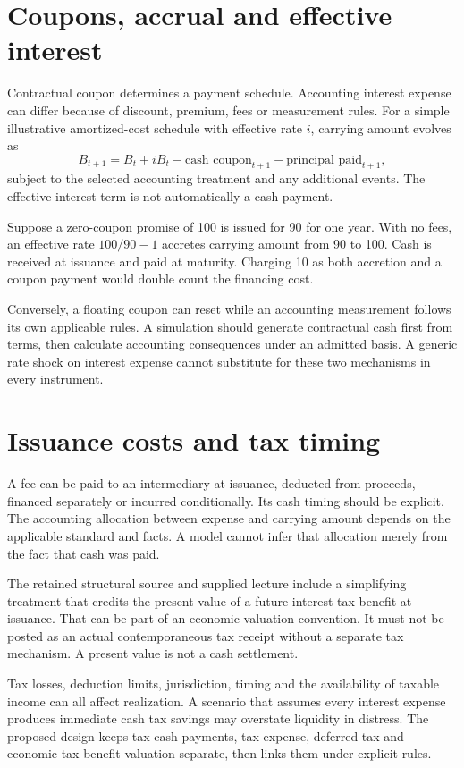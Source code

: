 \section{Coupons, accrual and effective interest}
Contractual coupon determines a payment schedule. Accounting interest expense can differ because of discount, premium, fees or measurement rules. For a simple illustrative amortized-cost schedule with effective rate $i$, carrying amount evolves as
\begin{equation}
 B_{t+1}=B_t+iB_t-\text{cash coupon}_{t+1}-\text{principal paid}_{t+1},
\end{equation}
subject to the selected accounting treatment and any additional events. The effective-interest term is not automatically a cash payment.

Suppose a zero-coupon promise of 100 is issued for 90 for one year. With no fees, an effective rate $100/90-1$ accretes carrying amount from 90 to 100. Cash is received at issuance and paid at maturity. Charging 10 as both accretion and a coupon payment would double count the financing cost.

Conversely, a floating coupon can reset while an accounting measurement follows its own applicable rules. A simulation should generate contractual cash first from terms, then calculate accounting consequences under an admitted basis. A generic rate shock on interest expense cannot substitute for these two mechanisms in every instrument.

\section{Issuance costs and tax timing}
A fee can be paid to an intermediary at issuance, deducted from proceeds, financed separately or incurred conditionally. Its cash timing should be explicit. The accounting allocation between expense and carrying amount depends on the applicable standard and facts. A model cannot infer that allocation merely from the fact that cash was paid.

The retained structural source and supplied lecture include a simplifying treatment that credits the present value of a future interest tax benefit at issuance. That can be part of an economic valuation convention. It must not be posted as an actual contemporaneous tax receipt without a separate tax mechanism. A present value is not a cash settlement.

Tax losses, deduction limits, jurisdiction, timing and the availability of taxable income can all affect realization. A scenario that assumes every interest expense produces immediate cash tax savings may overstate liquidity in distress. The proposed design keeps tax cash payments, tax expense, deferred tax and economic tax-benefit valuation separate, then links them under explicit rules.

